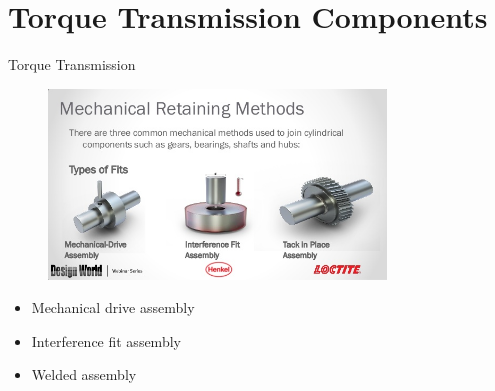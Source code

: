 \documentclass[10pt, svgnames]{beamer}
\begin{document}
\section{Torque Transmission Components}
\label{sec:org974b792}

\begin{frame}[label={sec:org398dfea}]{Torque Transmission}
\begin{figure}[htbp]
  \centering
  \includegraphics[width=0.8\textwidth]{Pictures/types-of-fits}
\end{figure}

\begin{itemize}
\item Mechanical drive assembly
\item Interference fit assembly
\item Welded assembly
\end{itemize}
\end{frame}
\end{document}
